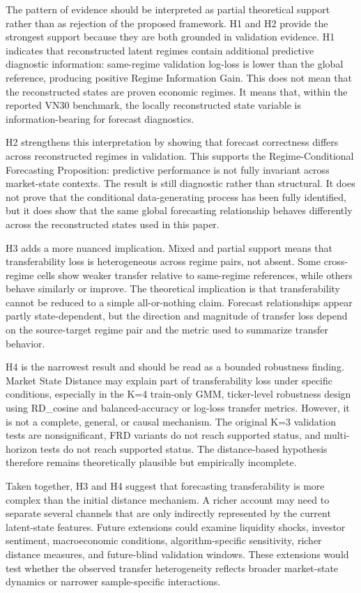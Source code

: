 \documentclass[12pt,a4paper]{article}
\begin{document}
The pattern of evidence should be interpreted as partial theoretical support rather than as rejection of the proposed framework. H1 and H2 provide the strongest support because they are both grounded in validation evidence. H1 indicates that reconstructed latent regimes contain additional predictive diagnostic information: same-regime validation log-loss is lower than the global reference, producing positive Regime Information Gain. This does not mean that the reconstructed states are proven economic regimes. It means that, within the reported VN30 benchmark, the locally reconstructed state variable is information-bearing for forecast diagnostics.

H2 strengthens this interpretation by showing that forecast correctness differs across reconstructed regimes in validation. This supports the Regime-Conditional Forecasting Proposition: predictive performance is not fully invariant across market-state contexts. The result is still diagnostic rather than structural. It does not prove that the conditional data-generating process has been fully identified, but it does show that the same global forecasting relationship behaves differently across the reconstructed states used in this paper.

H3 adds a more nuanced implication. Mixed and partial support means that transferability loss is heterogeneous across regime pairs, not absent. Some cross-regime cells show weaker transfer relative to same-regime references, while others behave similarly or improve. The theoretical implication is that transferability cannot be reduced to a simple all-or-nothing claim. Forecast relationships appear partly state-dependent, but the direction and magnitude of transfer loss depend on the source-target regime pair and the metric used to summarize transfer behavior.

H4 is the narrowest result and should be read as a bounded robustness finding. Market State Distance may explain part of transferability loss under specific conditions, especially in the K=4 train-only GMM, ticker-level robustness design using RD\_cosine and balanced-accuracy or log-loss transfer metrics. However, it is not a complete, general, or causal mechanism. The original K=3 validation tests are nonsignificant, FRD variants do not reach supported status, and multi-horizon tests do not reach supported status. The distance-based hypothesis therefore remains theoretically plausible but empirically incomplete.

Taken together, H3 and H4 suggest that forecasting transferability is more complex than the initial distance mechanism. A richer account may need to separate several channels that are only indirectly represented by the current latent-state features. Future extensions could examine liquidity shocks, investor sentiment, macroeconomic conditions, algorithm-specific sensitivity, richer distance measures, and future-blind validation windows. These extensions would test whether the observed transfer heterogeneity reflects broader market-state dynamics or narrower sample-specific interactions.
\end{document}
